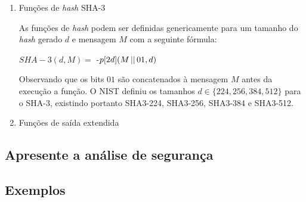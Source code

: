 \begin{enumerate}[label=\roman*.]
    \setlength\itemsep{1em}

    \item Funções de \textit{hash} SHA-3

        As funções de \textit{hash} podem ser definidas genericamente para um
        tamanho do \textit{hash} gerado $d$ e mensagem $M$ com a seguinte
        fórmula:

        $SHA-3(d, M) =$ \Keccak-$p[2d](M \operatorname{\lvert\rvert} 01, d)$ \newline

        Observando que os bits $01$ são concatenados à mensagem $M$ antes da
        execução a função. O NIST definiu os tamanhos
        $d \in \{224, 256, 384, 512\}$ para o SHA-3, existindo portanto
        SHA3-224, SHA3-256, SHA3-384 e SHA3-512.

    \item Funções de saída extendida
\end{enumerate}

\subsection{Apresente a análise de segurança}

\subsection{Exemplos}

\let\thesubsection\oldsubsection%
